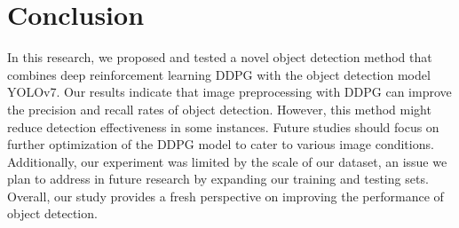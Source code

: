 \documentclass[PhD]{PHlab-thesis}
\begin{document}
\chapter{Conclusion}
In this research, we proposed and tested a novel object detection method that combines deep reinforcement learning DDPG with the object detection model YOLOv7. Our results indicate that image preprocessing with DDPG can improve the precision and recall rates of object detection. However, this method might reduce detection effectiveness in some instances. Future studies should focus on further optimization of the DDPG model to cater to various image conditions. Additionally, our experiment was limited by the scale of our dataset, an issue we plan to address in future research by expanding our training and testing sets. Overall, our study provides a fresh perspective on improving the performance of object detection.

\newpage
{}
\printbibliography
\end{document}

